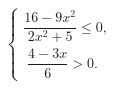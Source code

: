 \begin{ex}[type=ineq_system]
	\begin{condition}
		$\begin{cases} \dfrac{16 - 9x^2}{2x^2 + 5}\leqslant0,\\
			\;\dfrac{4 - 3x}{6}>0   .
		\end{cases}$
	\end{condition}
	\answer{$  \left(-\infty;-\dfrac{4}{3}\right]  .$}
\end{ex}